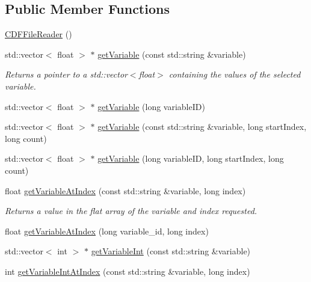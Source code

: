 \subsection*{Public Member Functions}
\begin{DoxyCompactItemize}
\item 
\hyperlink{classccmc_1_1_c_d_f_file_reader_ab045259d35214f14d3064d7e0c75186b}{C\-D\-F\-File\-Reader} ()
\item 
std\-::vector$<$ float $>$ $\ast$ \hyperlink{classccmc_1_1_c_d_f_file_reader_a0d642e05bc1692134212eee14e792eab}{get\-Variable} (const std\-::string \&variable)
\begin{DoxyCompactList}\small\item\em Returns a pointer to a std\-::vector$<$float$>$ containing the values of the selected variable. \end{DoxyCompactList}\item 
std\-::vector$<$ float $>$ $\ast$ \hyperlink{classccmc_1_1_c_d_f_file_reader_a96d9e7b832f3d689217af4d54898d5c0}{get\-Variable} (long variable\-I\-D)
\item 
std\-::vector$<$ float $>$ $\ast$ \hyperlink{classccmc_1_1_c_d_f_file_reader_a24ad5f1aafad6362f98e500a9cff6412}{get\-Variable} (const std\-::string \&variable, long start\-Index, long count)
\item 
std\-::vector$<$ float $>$ $\ast$ \hyperlink{classccmc_1_1_c_d_f_file_reader_ae969f1d20235ebeb533b6d90c5497b28}{get\-Variable} (long variable\-I\-D, long start\-Index, long count)
\item 
float \hyperlink{classccmc_1_1_c_d_f_file_reader_aaf8553b84f638e02c44d6a453ce089bc}{get\-Variable\-At\-Index} (const std\-::string \&variable, long index)
\begin{DoxyCompactList}\small\item\em Returns a value in the flat array of the variable and index requested. \end{DoxyCompactList}\item 
float \hyperlink{classccmc_1_1_c_d_f_file_reader_a93d6c7e3c8587812ed8ead92f2596049}{get\-Variable\-At\-Index} (long variable\-\_\-id, long index)
\item 
std\-::vector$<$ int $>$ $\ast$ \hyperlink{classccmc_1_1_c_d_f_file_reader_a4f46a67b2469c2fb5a963e2d00fe1424}{get\-Variable\-Int} (const std\-::string \&variable)
\item 
int \hyperlink{classccmc_1_1_c_d_f_file_reader_a6a1da27717bbac69ef9eb9eaeb06f677}{get\-Variable\-Int\-At\-Index} (const std\-::string \&variable, long index)

\end{DoxyCompactItemize}
